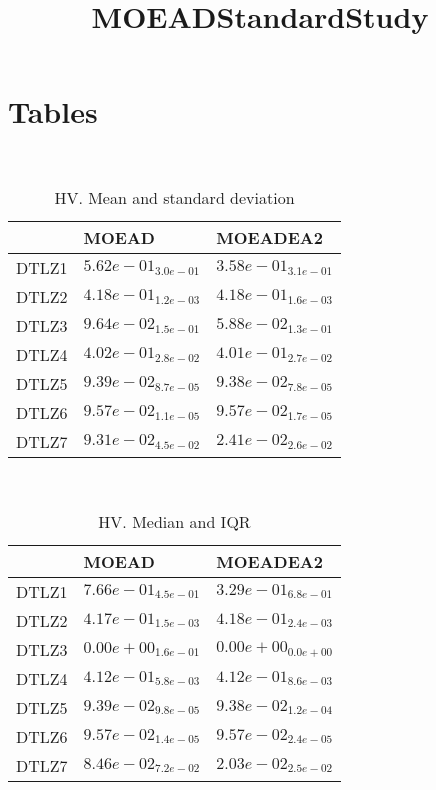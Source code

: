 \documentclass{article}
\title{MOEADStandardStudy}
\author{}
\begin{document}
\maketitle
\section{Tables}
\
\begin{table}
\caption{HV. Mean and standard deviation}
\label{table:mean.HV}
\centering
\begin{scriptsize}
\begin{tabular}{lll}
\hline & MOEAD &  MOEADEA2\\
\hline
DTLZ1 & \cellcolor{gray95}$  5.62e-01_{ 3.0e-01}$ & $  3.58e-01_{ 3.1e-01}$ \\
DTLZ2 & \cellcolor{gray95}$  4.18e-01_{ 1.2e-03}$ & $  4.18e-01_{ 1.6e-03}$ \\
DTLZ3 & \cellcolor{gray95}$  9.64e-02_{ 1.5e-01}$ & $  5.88e-02_{ 1.3e-01}$ \\
DTLZ4 & \cellcolor{gray95}$  4.02e-01_{ 2.8e-02}$ & $  4.01e-01_{ 2.7e-02}$ \\
DTLZ5 & \cellcolor{gray95}$  9.39e-02_{ 8.7e-05}$ & $  9.38e-02_{ 7.8e-05}$ \\
DTLZ6 & \cellcolor{gray95}$  9.57e-02_{ 1.1e-05}$ & $  9.57e-02_{ 1.7e-05}$ \\
DTLZ7 & \cellcolor{gray95}$  9.31e-02_{ 4.5e-02}$ & $  2.41e-02_{ 2.6e-02}$ \\
\hline
\end{tabular}
\end{scriptsize}
\end{table}
\
\begin{table}
\caption{HV. Median and IQR}
\label{table:median.HV}
\begin{scriptsize}
\centering
\begin{tabular}{lll}
\hline & MOEAD &  MOEADEA2\\
\hline
DTLZ1 & \cellcolor{gray95}$  7.66e-01_{ 4.5e-01}$ & $  3.29e-01_{ 6.8e-01}$ \\
DTLZ2 & \cellcolor{gray25}$  4.17e-01_{ 1.5e-03}$ & \cellcolor{gray95}$  4.18e-01_{ 2.4e-03}$ \\
DTLZ3 & $  0.00e+00_{ 1.6e-01}$ & $  0.00e+00_{ 0.0e+00}$ \\
DTLZ4 & \cellcolor{gray95}$  4.12e-01_{ 5.8e-03}$ & $  4.12e-01_{ 8.6e-03}$ \\
DTLZ5 & \cellcolor{gray95}$  9.39e-02_{ 9.8e-05}$ & $  9.38e-02_{ 1.2e-04}$ \\
DTLZ6 & \cellcolor{gray95}$  9.57e-02_{ 1.4e-05}$ & $  9.57e-02_{ 2.4e-05}$ \\
DTLZ7 & \cellcolor{gray95}$  8.46e-02_{ 7.2e-02}$ & $  2.03e-02_{ 2.5e-02}$ \\
\hline
\end{tabular}
\end{scriptsize}
\end{table}
\end{document}
